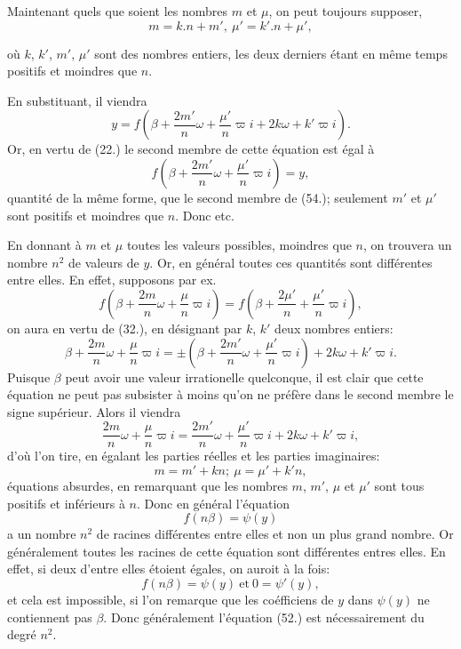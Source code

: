 \documentclass{article}
\begin{document}
Maintenant quels que soient les nombres $m$ et $\mu$, on peut toujours supposer,
\[ m=k.n+m',\ \mu'=k'.n+\mu', \]

où $k$, $k'$, $m'$, $\mu'$ sont des nombres entiers, les deux derniers étant en même temps positifs et moindres que $n$.

En substituant, il viendra
\[ y=f\left(\beta+\frac{2m'}{n}\omega+\frac{\mu'}{n}\varpi i+2k\omega+k'\varpi i\right). \]
Or, en vertu de (22.) le second membre de cette équation est égal à
\[ f\left(\beta+\frac{2m'}{n}\omega+\frac{\mu'}{n}\varpi i\right)=y, \tag{55.} \]
quantité de la même forme, que le second membre de (54.); seulement $m'$ et $\mu'$ sont positifs et moindres que $n$. Donc etc.

En donnant à $m$ et $\mu$ toutes les valeurs possibles, moindres que $n$, on trouvera un nombre $n^{2}$ de valeurs de $y$. Or, en général toutes ces quantités sont différentes entre elles. En effet, supposons par ex.
\[ f\left(\beta+\frac{2m}{n}\omega+\frac{\mu}{n}\varpi i\right)=f\left(\beta+\frac{2\mu'}{n}+\frac{\mu'}{n}\varpi i\right), \]
on aura en vertu de (32.), en désignant par $k$, $k'$ deux nombres entiers:
\[ \beta+\frac{2m}{n}\omega+\frac{\mu}{n}\varpi i=\pm\left(\beta+\frac{2m'}{n}\omega+\frac{\mu'}{n}\varpi i\right)+2k\omega+k'\varpi i. \]
Puisque $\beta$ peut avoir une valeur irrationelle quelconque, il est clair que cette équation ne peut pas subsister à moins qu'on ne préfère dans le second membre le signe supérieur. Alors il viendra
\[ \frac{2m}{n}\omega+\frac{\mu}{n}\varpi i=\frac{2m'}{n}\omega+\frac{\mu'}{n}\varpi i+2k\omega+k'\varpi i, \]
d'où l'on tire, en égalant les parties réelles et les parties imaginaires:
\[ m=m'+kn;\ \mu=\mu'+k'n, \]
équations absurdes, en remarquant que les nombres $m$, $m'$, $\mu$ et $\mu'$ sont tous positifs et inférieurs à $n$. Donc en général l'équation
\[ f(n\beta)=\psi(y) \]
a un nombre $n^{2}$ de racines différentes entre elles et non un plus grand nombre. Or généralement toutes les racines de cette équation sont différentes entres elles. En effet, si deux d'entre elles étoient égales, on auroit à la fois:
\[ f(n\beta)=\psi(y)\ \text{et}\ 0=\psi'(y), \]
et cela est impossible, si l'on remarque que les coéfficiens de $y$ dans $\psi(y)$ ne contiennent pas $\beta$. Donc généralement l'équation (52.) est nécessairement du degré $n^{2}$.
\end{document}
